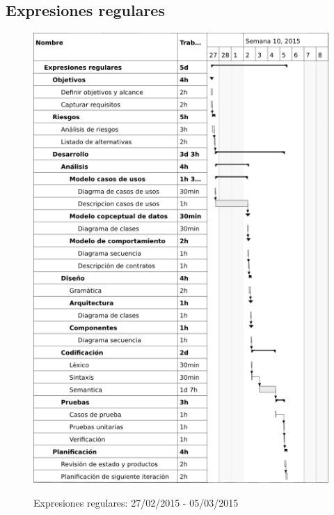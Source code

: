 \subsection{Expresiones regulares}
\begin{center}
\begin{figure}[H]
\centering
\includegraphics[scale=1]{planning/14-expresiones-regulares.png} \\
\caption{Expresiones regulares: 27/02/2015 - 05/03/2015 }
\end{figure}
\end{center}

